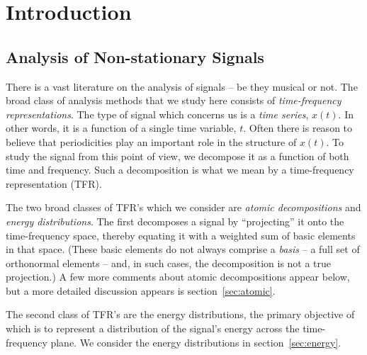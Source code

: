 %
\section{Introduction}
\subsection{Analysis of Non-stationary Signals}
There is a vast literature on the analysis of signals -- be they
musical or not.  The broad class of analysis methods that we study here
consists of {\it time-frequency representations}.  The type of signal
which concerns us is a {\it time series}, $x(t)$.  In other words, it
is a function of a single time variable, $t$.  Often there is reason
to believe that periodicities play an important role in the structure
of $x(t)$.  To study the signal from this point of view, we decompose
it as a function of both time and frequency. Such a decomposition is
what we mean by a time-frequency representation (TFR).

The two broad classes of TFR's which we consider are {\it atomic
decompositions} and {\it energy distributions}.  The first decomposes a
signal by ``projecting'' it onto the time-frequency space, thereby equating
it with a weighted sum of basic elements in that space. (These basic elements
do not always comprise a {\it basis} -- a full set of orthonormal 
elements -- and, in such cases, the decomposition is not a true projection.)
A few more comments about atomic decompositions appear below, but a more
detailed discussion appears is section~\ref{sec:atomic}.

The second class of TFR's are the energy distributions, the primary
objective of which is to represent a distribution of the signal's energy
across the time-frequency plane.  We consider the energy distributions in
section~\ref{sec:energy}. 

